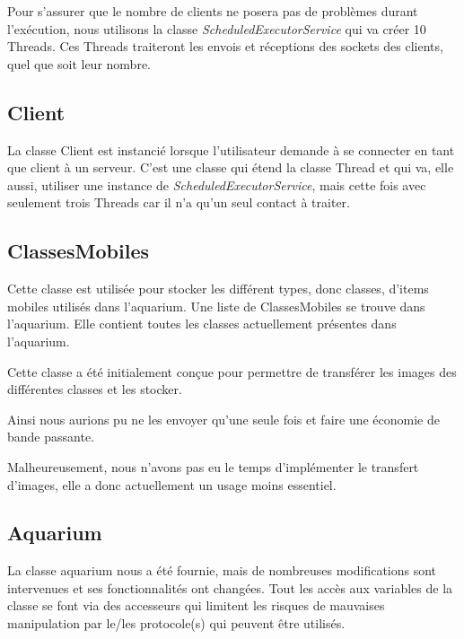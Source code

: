 \documentclass[a4paper, 12pt]{report}
\begin{document}
\begin{spacing}{1.3}
Pour s'assurer que le nombre de clients ne posera pas de problèmes durant l'exécution, nous utilisons la classe \textit{ScheduledExecutorService} qui va créer 10 Threads. Ces Threads traiteront les envois et réceptions des sockets des clients, quel que soit leur nombre.
	
\textcolor{colortitre3}{\subsection*{Client}}

La classe Client est instancié lorsque l'utilisateur demande à se connecter en tant que client à un serveur. C'est une classe qui étend la classe Thread et qui va, elle aussi, utiliser une instance de \textit{ScheduledExecutorService}, mais cette fois avec seulement trois Threads car il n'a qu'un seul contact à traiter.
		
\textcolor{colortitre3}{\subsection*{ClassesMobiles}}
		
Cette classe est utilisée pour stocker les différent types, donc classes, d'items mobiles utilisés dans l'aquarium. Une liste de ClassesMobiles se trouve dans l'aquarium. Elle contient toutes les classes actuellement présentes dans l'aquarium.

Cette classe a été initialement conçue pour permettre de transférer les images des différentes classes et les stocker.

Ainsi nous aurions pu ne les envoyer qu'une seule fois et faire une économie de bande passante.

Malheureusement, nous n'avons pas eu le temps d'implémenter le transfert d'images, elle a donc actuellement un usage moins essentiel.

\textcolor{colortitre3}{\subsection*{Aquarium}}
		
	La classe aquarium nous a été fournie, mais de nombreuses modifications sont intervenues et ses fonctionnalités ont changées.
	Tout les accès aux variables de la classe se font via des accesseurs qui limitent les risques de mauvaises manipulation par le/les protocole(s) qui peuvent être utilisés.
	

\end{spacing}
\end{document}

